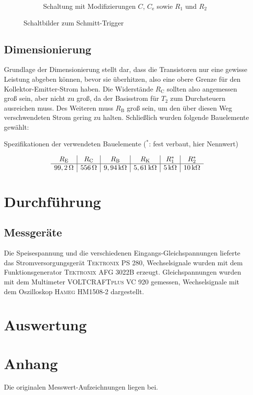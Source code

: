 \documentclass[numbers=noenddot,10pt,a4paper]{scrartcl}
\newcommand{\ix}[1]{_\text{#1}}
\begin{document}
\begin{figure}[H]
\begin{subfigure}[b]{0.49\textwidth}
\caption{Schaltung mit Modifizierungen $C$, $C\ix{e}$ sowie $R_1$ und $R_2$}
\end{subfigure}
\caption{Schaltbilder zum Schmitt-Trigger}
\end{figure}
\subsection{Dimensionierung}
Grundlage der Dimensionierung stellt dar, dass die Transistoren nur eine gewisse Leistung abgeben können, bevor sie überhitzen, also eine obere Grenze für den Kollektor-Emitter-Strom haben. Die Widerstände $R\ix{C}$ sollten also angemessen groß sein, aber nicht zu groß, da der Basisstrom für $T_2$ zum Durchsteuern ausreichen muss. Des Weiteren muss $R\ix{B}$ groß sein, um den über diesen Weg verschwendeten Strom gering zu halten. Schließlich wurden folgende Bauelemente gewählt:
\begin{table}[H]
\caption{Spezifikationen der verwendeten Bauelemente ($^*$: fest verbaut, hier Nennwert)}
\vspace{-1em}
\begin{align*}
\begin{array}{c|c|c|c|c|c}
R\ix{E} & R\ix{C} & R\ix{B} & R\ix{K} & R_1^* & R_2^* \\ \hline
\unit[99,2]{\Omega} & \unit[556]{\Omega} & \unit[9,94]{k\Omega} & \unit[5,61]{k\Omega} & \unit[5]{k\Omega} & \unit[10]{k\Omega}
\end{array} 
\end{align*}
\end{table}
\section{Durchführung}
\subsection{Messgeräte}
Die Speisespannung und die verschiedenen Eingangs-Gleichspannungen lieferte das Stromversorgungsgerät \textsc{Tektronix PS 280}, Wechselsignale wurden mit dem Funktionsgenerator \textsc{Tektronix AFG 3022B} erzeugt. Gleichspannungen wurden mit dem Multimeter \textsc{VOLTCRAFTplus VC 920} gemessen, Wechselsignale mit dem Oszilloskop \textsc{Hameg HM1508-2} dargestellt.
\section{Auswertung}
\section{Anhang}
Die originalen Messwert-Aufzeichnungen liegen bei.
\end{document}
